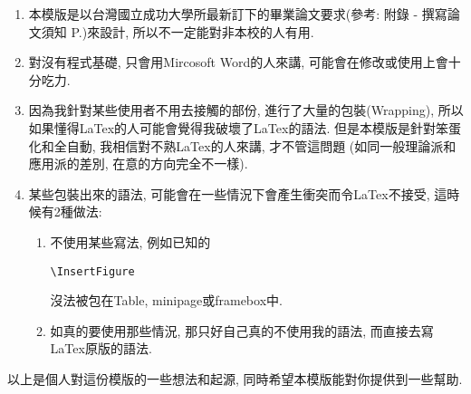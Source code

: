 \begin{enumerate}

  \item
  {
    本模版是以台灣國立成功大學所最新訂下的畢業論文要求(參考: 附錄 - 撰寫論文須知 P.)來設計, 所以不一定能對非本校的人有用.
  } %

  \item
  {
    對沒有程式基礎, 只會用Mircosoft Word的人來講, 可能會在修改或使用上會十分吃力.
  } %

  \item
  {
    因為我針對某些使用者不用去接觸的部份, 進行了大量的包裝(Wrapping), 所以如果懂得LaTex的人可能會覺得我破壞了LaTex的語法. 但是本模版是針對笨蛋化和全自動, 我相信對不熟LaTex的人來講, 才不管這問題 (如同一般理論派和應用派的差別, 在意的方向完全不一樣).
  } %

  \item
  {
    某些包裝出來的語法, 可能會在一些情況下會產生衝突而令LaTex不接受, 這時候有2種做法:
    \begin{enumerate}
      \item
      {
        不使用某些寫法, 例如已知的\begin{verbatim}\InsertFigure\end{verbatim}沒法被包在Table, minipage或framebox中.
      } %

      \item
      {
        如真的要使用那些情況, 那只好自己真的不使用我的語法, 而直接去寫LaTex原版的語法.
      } %
    \end{enumerate}
  } %
\end{enumerate}



以上是個人對這份模版的一些想法和起源, 同時希望本模版能對你提供到一些幫助.

\EndChapter
